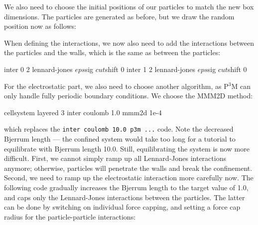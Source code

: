 \documentclass[
a4paper,                        %
11pt,                           %
twoside,                        %
footsepline,                    %
headsepline,                    %
headexclude,                    %
footexclude,                    %
pagesize,                       %
]{scrartcl}
\begin{document}
We also need to choose the initial positions of our particles to match
the new box dimensions. The particles are generated as before, but we
draw the random position now as follows:


When defining the interactions, we now also need to add the
interactions between the particles and the walls, which is the same as
between the particles:

\begin{tclcode}
  inter 0 2 lennard-jones $eps $sig $cut $shift 0
  inter 1 2 lennard-jones $eps $sig $cut $shift 0
\end{tclcode}

For the electrostatic part, we also need to choose another algorithm,
as P$^3$M can only handle fully periodic boundary conditions. We
choose the MMM2D method:

\begin{tclcode}
  cellsystem layered 3
  inter coulomb 1.0 mmm2d 1e-4  
\end{tclcode}

which replaces the \verb|inter coulomb 10.0 p3m ...| code. Note the
decreased Bjerrum length --- the confined system would take too long for
a tutorial to equilibrate with Bjerrum length 10.0. Still,
equilibrating the system is now more difficult. First, we cannot
simply ramp up all Lennard-Jones interactions anymore; otherwise,
particles will penetrate the walls and break the confinement. Second,
we need to ramp up the electrostatic interaction more carefully
now. The following code gradually increases the Bjerrum length to the
target value of 1.0, and caps only the Lennard-Jones interactions
between the particles. The latter can be done by switching on
individual force capping, and setting a force cap radius for the
particle-particle interactions:

\end{document}
